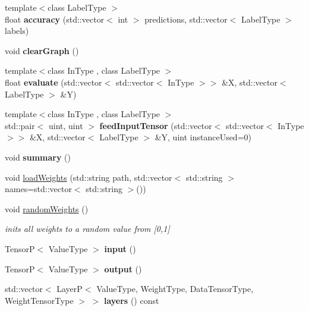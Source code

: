 \begin{DoxyCompactItemize}
\item 
\mbox{\label{classModel_a2c0b8fbc2827d78b6c104196defd92c4}} 
{\footnotesize template$<$class Label\+Type $>$ }\\float {\bfseries accuracy} (std\+::vector$<$ int $>$ predictions, std\+::vector$<$ Label\+Type $>$ labels)
\item 
\mbox{\label{classModel_a90a7db6321accedf88cfcbe260ac6c51}} 
void {\bfseries clear\+Graph} ()
\item 
\mbox{\label{classModel_a94749563652423f8e4cd78efc4717b80}} 
{\footnotesize template$<$class In\+Type , class Label\+Type $>$ }\\float {\bfseries evaluate} (std\+::vector$<$ std\+::vector$<$ In\+Type $>$$>$ \&X, std\+::vector$<$ Label\+Type $>$ \&Y)
\item 
\mbox{\label{classModel_a51cbbac990dc529799bf0d6584ece019}} 
{\footnotesize template$<$class In\+Type , class Label\+Type $>$ }\\std\+::pair$<$ uint, uint $>$ {\bfseries feed\+Input\+Tensor} (std\+::vector$<$ std\+::vector$<$ In\+Type $>$$>$ \&X, std\+::vector$<$ Label\+Type $>$ \&Y, uint instance\+Used=0)
\item 
\mbox{\label{classModel_a1ba1c560ce80a98ddb4387c12ca80061}} 
void {\bfseries summary} ()
\item 
void \hyperlink{classModel_a10800ec7771d181bc93ea8a85206cbb0}{load\+Weights} (std\+::string path, std\+::vector$<$ std\+::string $>$ names=std\+::vector$<$ std\+::string $>$())
\item 
\mbox{\label{classModel_a218d5041a6d06771ba708033a0cea1ad}} 
void \hyperlink{classModel_a218d5041a6d06771ba708033a0cea1ad}{random\+Weights} ()
\begin{DoxyCompactList}\small\item\em inits all weights to a random value from \mbox{[}0,1\mbox{]} \end{DoxyCompactList}\item 
\mbox{\label{classModel_a77e793c902a5e53134fe53259ddc110d}} 
TensorP$<$ Value\+Type $>$ {\bfseries input} ()
\item 
\mbox{\label{classModel_a6e51e106d42b7286ffc0767f6c4b96a4}} 
TensorP$<$ Value\+Type $>$ {\bfseries output} ()
\item 
\mbox{\label{classModel_aaf1a291634a6550f6f1f914efbd1f349}} 
std\+::vector$<$ LayerP$<$ Value\+Type, Weight\+Type, Data\+Tensor\+Type, Weight\+Tensor\+Type $>$ $>$ {\bfseries layers} () const
\end{DoxyCompactItemize}

